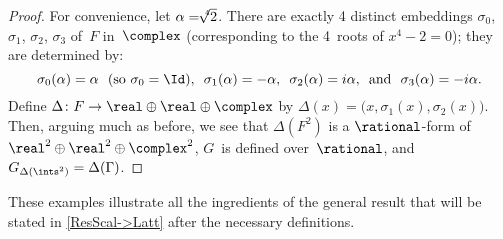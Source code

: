 \begin{proof}
 For convenience, let $\alpha = \!\root 4\!\! \of 2$. There are
exactly 4 distinct embeddings $\sigma_0$, $\sigma_1$,
$\sigma_2$, $\sigma_3$ of~$F$ in~$\complex$ (corresponding
to the 4~roots of $x^4 - 2 = 0$); they are determined by:
 $$ \text{$\sigma_0(\alpha) = \alpha$ \  (so $\sigma_0 = \Id$),
 \  $\sigma_1(\alpha) = -\alpha$,
 \  $\sigma_2(\alpha) = i\alpha$, 
 \ and
 \  $\sigma_3(\alpha) = -i\alpha$}
 . $$
 Define $\Delta \colon F \to \real \oplus \real \oplus
\complex$ by $\Delta(x) = \bigl( x, \sigma_1(x), \sigma_2(x)
\bigr)$. Then, arguing much as before, we see that
$\Delta(F^2)$ is a $\rational$-form of~$\real^2 \oplus
\real^2 \oplus \complex^2$, $G$~is defined over~$\rational$,
and $G_{\Delta(\ints^2)} = \Delta(\Gamma)$.
 \end{proof}

These examples illustrate all the ingredients of the general result that will be stated in \cref{ResScal->Latt} after the necessary definitions.


